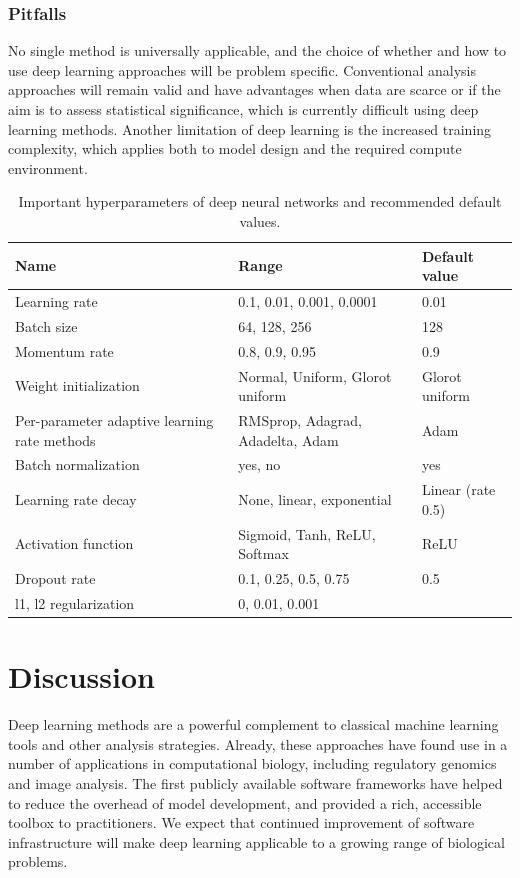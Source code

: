 \subsubsection{Pitfalls}
No single method is universally applicable, and the choice of whether and how to use deep learning approaches will be problem specific. Conventional analysis approaches will remain valid and have advantages when data are scarce or if the aim is to assess statistical significance, which is currently difficult using deep learning methods. Another limitation of deep learning is the increased training complexity, which applies both to model design and the required compute environment.

\begin{table}
\centering
\begin{tabular}{p{4cm}|p{5cm}|p{4cm}}
\textbf{Name} & \textbf{Range} & \textbf{Default value} \\
\toprule
Learning rate & 0.1, 0.01, 0.001, 0.0001 & 0.01 \\
Batch size & 64, 128, 256 & 128 \\
Momentum rate & 0.8, 0.9, 0.95 & 0.9 \\
Weight initialization & Normal, Uniform, Glorot uniform & Glorot uniform \\
Per-parameter adaptive learning rate methods & RMSprop, Adagrad, Adadelta, Adam & Adam \\
Batch normalization & yes, no & yes \\
Learning rate decay & None, linear, exponential & Linear (rate 0.5) \\
Activation function & Sigmoid, Tanh, ReLU, Softmax & ReLU \\
Dropout rate & 0.1, 0.25, 0.5, 0.75 & 0.5 \\
l1, l2 regularization & 0, 0.01, 0.001 & \\
\bottomrule
\end{tabular}
\caption{Important hyperparameters of deep neural networks and recommended default values.}
\label{tab:dl_params}
\end{table}


\section{Discussion}

Deep learning methods are a powerful complement to classical machine learning tools and other analysis strategies. Already, these approaches have found use in a number of applications in computational biology, including regulatory genomics and image analysis. The first publicly available software frameworks have helped to reduce the overhead of model development, and provided a rich, accessible toolbox to practitioners. We expect that continued improvement of software infrastructure will make deep learning applicable to a growing range of biological problems.
